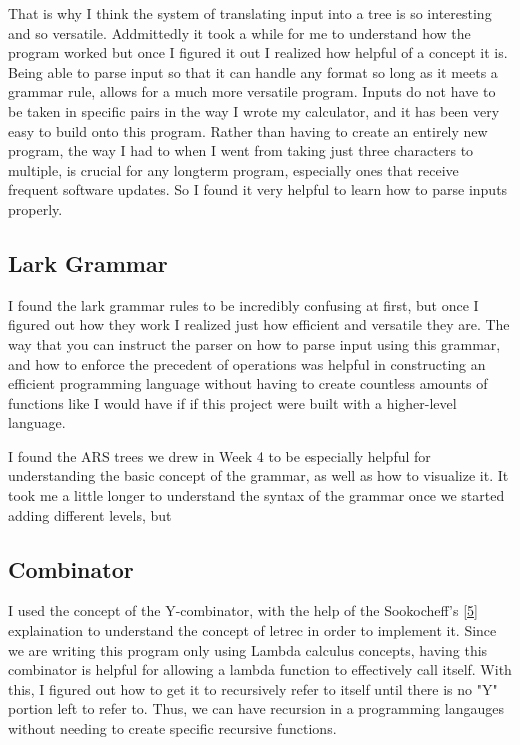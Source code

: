 \documentclass{article}
\theoremstyle{theorem}
\theoremstyle{definition}
\theoremstyle{remark}
\begin{document}
That is why I think the system of translating input into a tree is so interesting and so versatile. Addmittedly it took a while for me to understand how the 
program worked but once I figured it out I realized how helpful of a concept it is. Being able to parse input so that it can handle any format so long as it
 meets a grammar rule, allows for a much more versatile program. Inputs do not have to be taken in specific pairs in the way I wrote my calculator, and it has been very 
 easy to build onto this program. Rather than having to create an entirely new program, the way I had to when I went from taking just three characters to multiple, is crucial for 
 any longterm program, especially ones that receive frequent software updates. So I found it very helpful to learn how to parse inputs properly.

\subsection{Lark Grammar}

I found the lark grammar rules to be incredibly confusing at first, but once I figured out how they work I realized just how efficient and versatile they are. The way that you can 
instruct the parser on how to parse input using this grammar, and how to enforce the precedent of operations was helpful in constructing an efficient programming language without having to create countless amounts of functions like I would have if
if this project were built with a higher-level language. 

\hspace{0.65cm}I found the ARS trees we drew in Week 4 to be especially helpful for understanding the basic concept of the grammar, as well as how to visualize it. It took me a little longer to understand the syntax of the grammar once we started 
adding different levels, but 

\subsection{Combinator}

I used the concept of the Y-combinator, with the help of the Sookocheff's \hyperref[5]{[5]} explaination to understand the concept of letrec in order to implement it. Since we are writing this program only using Lambda calculus concepts, 
having this combinator is helpful for allowing a lambda function to effectively call itself. With this, I figured out how to get it to recursively refer to itself until there is no "Y" portion left to refer to. Thus, we can have recursion in a programming langauges
without needing to create specific recursive functions.
\end{document}
